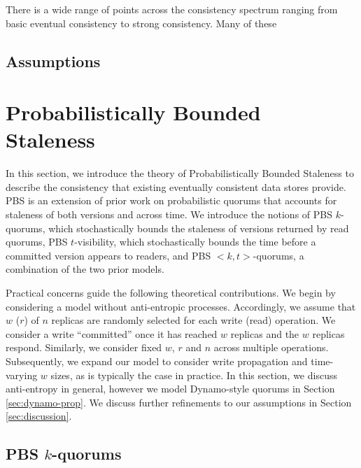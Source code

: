 \documentclass{vldb}
\begin{document}
There is a wide range of points across the consistency spectrum
ranging from basic eventual consistency to strong consistency.  Many of these 

\subsection{Assumptions}



\section{Probabilistically Bounded\\Staleness}
\label{sec:theory}

In this section, we introduce the theory of Probabilistically Bounded
Staleness to describe the consistency that existing eventually
consistent data stores provide.  PBS is an extension of prior work on
probabilistic quorums that accounts for staleness of both versions and
across time.  We introduce the notions of PBS $k$-quorums, which
stochastically bounds the staleness of versions returned by read
quorums, PBS $t$-visibility, which stochastically bounds the time
before a committed version appears to readers, and PBS $<k,
t>$-quorums, a combination of the two prior models.


Practical concerns guide the following theoretical contributions.  We
begin by considering a model without anti-entropic processes.
Accordingly, we assume that $w$ ($r$) of $n$ replicas are randomly
selected for each write (read) operation.  We consider a write
``committed'' once it has reached $w$ replicas and the $w$ replicas
respond.  Similarly, we consider fixed $w$, $r$ and $n$ across
multiple operations. Subsequently, we expand our model to consider
write propagation and time-varying $w$ sizes, as is typically the case
in practice.  In this section, we discuss anti-entropy in general,
however we model Dynamo-style quorums in Section
\ref{sec:dynamo-prop}. We discuss further refinements to our
assumptions in Section \ref{sec:discussion}.

\subsection{PBS $k$-quorums}
\end{document}
